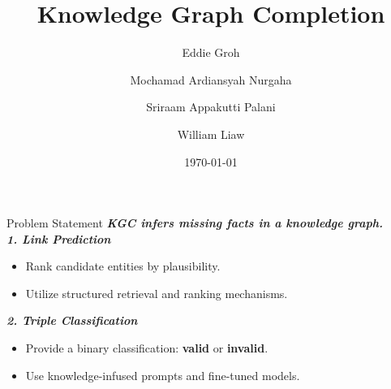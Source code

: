 \documentclass[aspectratio=169,xcolor=dvipsnames]{beamer}
\title{Knowledge Graph Completion}
\subtitle{}
\author{Eddie Groh \and Mochamad Ardiansyah Nurgaha \and Sriraam Appakutti Palani \and William Liaw}
\institute[Team: AWESome]
{
    Language Models and Structured Data\\
}
\date{\today}
\begin{document}
\begin{frame}
    \titlepage
\end{frame}




\begin{frame}{Problem Statement}
    \textbf{\textit{KGC infers missing facts in a knowledge graph.}}\\
    \vspace{0.3cm}
    \textbf{\textit{1. Link Prediction}} %
    \begin{itemize}
        \item  Rank candidate entities by plausibility.
        \item  Utilize structured retrieval and ranking mechanisms.
    \end{itemize}

    \begin{center}
    \end{center}

\textit{\textbf{2. Triple Classification}} %
    \begin{itemize}
        \item Provide a binary classification: \textbf{valid} or \textbf{invalid}.
        \item Use knowledge-infused prompts and fine-tuned models.
    \end{itemize}

    \begin{center}
    \end{center}
\end{frame}
\end{document}
